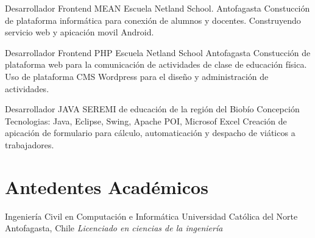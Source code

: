 \documentclass[draft,color,12pt,letterpaper,sans]{moderncv}
\begin{document}
{Desarrollador Frontend MEAN}
{Escuela Netland School.}
{Antofagasta}
{}
{Constucci\'on de plataforma inform\'atica para conexi\'on de alumnos y docentes. Construyendo servicio web y apicaci\'on movil Android.\newline}

{Desarrollador Frontend PHP}
{Escuela Netland School}
{Antofagasta}
{}
{Constucci\'on de plataforma web para la comunicaci\'on de actividades de clase de educaci\'on f\'isica. Uso de plataforma CMS Wordpress para el dise\~no y administraci\'on de actividades.\newline}

{Desarrollador JAVA}
{SEREMI de educación de la región del Biobío}
{Concepci\'on}
{\newline Tecnologias: Java, Eclipse, Swing, Apache POI, Microsof Excel}
{Creaci\'on de apicaci\'on de formulario para c\'alculo, automaticaci\'on y despacho de vi\'aticos a trabajadores.\newline}


\section{Antedentes Acad\'emicos}
{Ingenier\'ia Civil en Computaci\'on e Inform\'atica}
{Universidad Cat\'olica del Norte}
{Antofagasta, Chile}
{\textit{Licenciado en ciencias de la ingenier\'ia}}
{}
\newpage
\end{document}
